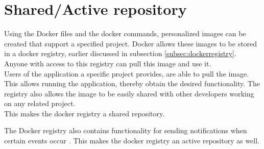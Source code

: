 

\section{Shared/Active repository}

Using the Docker files and the docker commands, personalized images can be created that support a specified project. Docker allows these images to be stored in a docker registry, earlier discussed in subsection \ref{subsec:dockerregistry}. Anyone with access to this registry can pull this image and use it.\\
Users of the application a specific project provides, are able to pull the image. This allows running the application, thereby obtain the desired functionality. The registry also allows the image to be easily shared with other developers working on any related project.\\
This makes the docker registry a shared repository.



The Docker registry also contains functionality for sending notifications when certain events occur \cite{docknotif}. This makes the docker registry an active repository as well.

